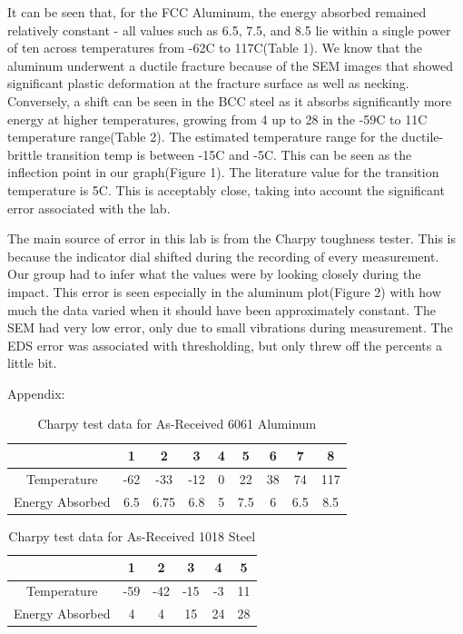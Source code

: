 \documentclass{article}
\begin{document}
It can be seen that, for the FCC Aluminum, the energy absorbed remained relatively constant - all values such as 6.5, 7.5, and 8.5 lie within a single power of ten across temperatures from -62C to 117C(Table 1). We know that the aluminum underwent a ductile fracture because of the SEM images that showed significant plastic deformation at the fracture surface as well as necking. Conversely, a shift can be seen in the BCC steel as it absorbs significantly more energy at higher temperatures, growing from 4 up to 28 in the -59C to 11C temperature range(Table 2). The estimated temperature range for the ductile-brittle transition temp is between -15C and -5C. This can be seen as the inflection point in our graph(Figure 1). The literature value for the transition temperature is 5C. This is acceptably close, taking into account the significant error associated with the lab.

The main source of error in this lab is from the Charpy toughness tester. This is because the indicator dial shifted during the recording of every measurement. Our group had to infer what the values were by looking closely during the impact. This error is seen especially in the aluminum plot(Figure 2) with how much the data varied when it should have been approximately constant. The SEM had very low error, only due to small vibrations during measurement. The EDS error was associated with thresholding, but only threw off the percents a little bit.

\clearpage

Appendix:\\

\begin{table}[h]
\centering
\caption{Charpy test data for As-Received 6061 Aluminum}
\begin{tabular}{||c | c | c | c | c | c | c | c | c||}
	\hline
	\ 							& 1 & 2 & 3 & 4 & 5 & 6 & 7 & 8\\
	\hline \hline
	Temperature		& -62 & -33 & -12 & 0 & 22 & 38 & 74 & 117\\
	Energy Absorbed& 6.5 & 6.75 & 6.8 & 5 & 7.5 & 6 & 6.5 & 8.5\\
	\hline
\end{tabular}
\end{table}

\begin{table}[h]
\centering
\caption{Charpy test data for As-Received 1018 Steel}
\begin{tabular}{||c | c | c | c | c | c||}
	\hline
	\ 							& 1 & 2 & 3 & 4 & 5\\
	\hline \hline
	Temperature		& -59 & -42 & -15 & -3 & 11\\
	Energy Absorbed	& 4 & 4 & 15 & 24 & 28\\
	\hline
\end{tabular}
\end{table}
\end{document}
